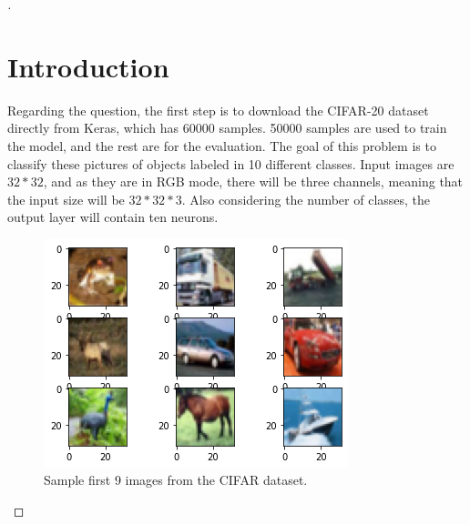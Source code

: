 \documentclass[12pt,oneside,geqno]{article}
\begin{document}
	\begin{proof}[\color{red}{Solution}]
		
		\section{Introduction}
		
		Regarding the question, the first step is to download the CIFAR-20 dataset directly from Keras, which has 60000 samples. 50000 samples are used to train the model, and the rest are for the evaluation. The goal of this problem is to classify these pictures of objects labeled in 10 different classes. Input images are \(32*32\), and as they are in RGB mode, there will be three channels, meaning that the input size will be \(32*32*3\). Also considering the number of classes, the output layer will contain ten neurons.
		\begin{figure}
			\centering
			\includegraphics[width=\textwidth]{../figs/q1_sample.png}
			\caption{Sample first 9 images from the CIFAR dataset.}
			\label{img:q1_sample}
		\end{figure}
		

\end{proof}
\end{document}

